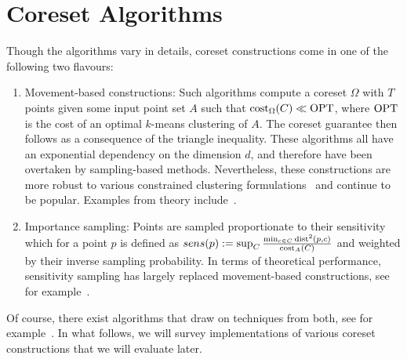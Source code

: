 \section{Coreset Algorithms}
\label{sec:algorithms}

Though the algorithms vary in details, coreset constructions come in one of the following two flavours:
\begin{enumerate}
\item Movement-based constructions: Such algorithms compute a coreset $\Omega$ with $T$ points given some input point set $A$ such that $\text{cost}_{\Omega}(C)\ll \text{OPT}$, where $\text{OPT}$ is the cost of an optimal $k$-means clustering of $A$. 
The coreset guarantee then follows as a consequence of the triangle inequality. These algorithms all have an exponential dependency on the dimension $d$, and therefore have been overtaken by sampling-based methods. Nevertheless, these constructions are more robust to various constrained clustering formulations~\cite{HuangJV19,SSS19} and continue to be popular. Examples from theory include~\cite{FrahlS2005,HaM04}. 
\item Importance sampling: Points are sampled proportionate to their sensitivity which for a point $p$ is defined as $sens(p):=\sup_{C} \frac{\min_{c\in C} \text{dist}^2(p,c)}{\text{cost}_A(C)}$ and weighted by their inverse sampling probability. In terms of theoretical performance, sensitivity sampling has largely replaced movement-based constructions, see for example~\cite{FeldmanL11,LangbergS10}.  
\end{enumerate}

Of course, there exist algorithms that draw on techniques from both, see for example~\cite{Cohen-AddadSS21}. In what follows, we will survey implementations of various coreset constructions that we will evaluate later.



